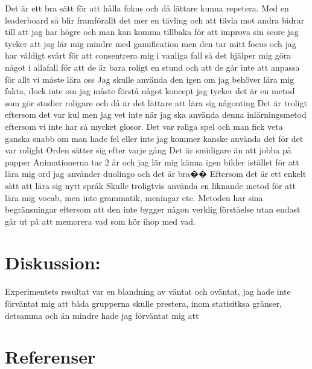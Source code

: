 \documentclass[11p]{article}
\begin{document}
Det är ett bra sätt för att hålla fokus och då lättare kunna repetera.
Med en leaderboard så blir framförallt det mer en tävling och att tävla mot andra bidrar till att jag har högre  och man kan komma tillbaka för att improva sin score
jag tycker att jag lär mig mindre med gamification men den tar mitt focus och jag har väldigt svårt för att consentrera mig i vanliga fall så det hjälper mig göra något i allafall
för att de är bara roligt en stund och att de går inte att anpassa för allt vi måste lära oss
Jag skulle använda den igen om jag behöver lära mig fakta, dock  inte om jag måste förstå något koncept
jag tycker det är en metod som gör studier roligare och då är det lättare att lära sig någonting
Det är troligt eftersom det var kul men jag vet inte när jag ska använda denna inlärningsmetod eftersom vi inte har så mycket glosor.
Det var roliga spel och man fick veta ganska snabb om man hade fel eller inte
jag kommer kanske använda det för det var rolight
Orden sätter sig efter varje gång
Det är smidigare än att jobba på papper
Animationerna tar 2 år och jag lär mig känna igen bilder istället för att lära mig ord
jag använder duolingo och det är bra��
Eftersom det är ett enkelt sätt att lära sig nytt språk
Skulle troligtvis använda en liknande metod för att lära mig vocab, men inte grammatik, meningar etc. Metoden har sina begränsningar eftersom att den inte bygger någon verklig förståelse utan endast går ut på att memorera vad som hör ihop med vad.

\section{Diskussion:} Experimentets resultat var en blandning av väntat och oväntat, jag hade inte förväntat mig att båda grupperna skulle prestera, inom statisitksa gränser, detsamma och än mindre hade jag förväntat mig att
\\

\section{Referenser}
\end{document}

